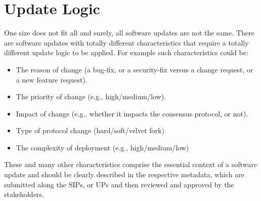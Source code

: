 \section{Update Logic}
One size does not fit all and surely, all software updates are not the same. There are software updates with totally different characteristics that require a totally different update logic to be applied. For example such characteristics could be:
\begin{itemize}
\item The reason of change (a bug-fix, or a security-fix versus a change request, or a new feature request).
\item The priority of change (e.g., high/medium/low).
\item Impact of change (e.g., whether it impacts the consensus protocol, or not).
\item Type of protocol change (hard/soft/velvet fork)
\item The complexity of deployment (e.g., high/medium/low)
\end{itemize}
These and many other characteristics comprise the essential context of a software update and should be clearly described in the respective metadata, which are submitted along the SIPs, or UPs and then reviewed and approved by the stakeholders.

